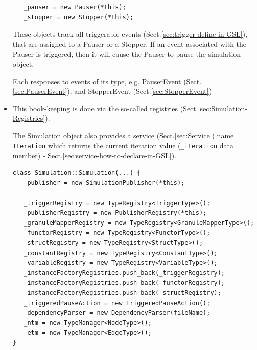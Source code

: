 \begin{itemize}
\begin{lstlisting}
   _pauser = new Pauser(*this);                                                                               
   _stopper = new Stopper(*this);                                                                             
\end{lstlisting}

These objects track all triggerable events
(Sect.\ref{sec:trigger-define-in-GSL}), that are assigned to a Pauser or a
Stopper. If an event associated with the Pauser is triggered, then it will cause
the Pauser to pause the simulation object.

Each responses to events of its type, e.g. PauserEvent (Sect.\ref{sec:PauserEvent}), and
StopperEvent (Sect.\ref{sec:StopperEvent})

  \item  This book-keeping is done via the so-called registries
(Sect.\ref{sec:Simulation-Registries}). 

The Simulation object also provides a service (Sect.\ref{sec:Service}) name
\verb!Iteration! which returns the current iteration value (\verb!_iteration!
data member) - Sect.\ref{sec:service-how-to-declare-in-GSL}).

\begin{verbatim}
class Simulation::Simulation(...) {
   _publisher = new SimulationPublisher(*this);                                                               
 
   _triggerRegistry = new TypeRegistry<TriggerType>();                                                        
   _publisherRegistry = new PublisherRegistry(*this);                                                         
   _granuleMapperRegistry = new TypeRegistry<GranuleMapperType>();                                                      
   _functorRegistry = new TypeRegistry<FunctorType>();                                                        
   _structRegistry = new TypeRegistry<StructType>();                                                          
   _constantRegistry = new TypeRegistry<ConstantType>();                                                      
   _variableRegistry = new TypeRegistry<VariableType>();                                                      
   _instanceFactoryRegistries.push_back(_triggerRegistry);                                                    
   _instanceFactoryRegistries.push_back(_functorRegistry);                                                    
   _instanceFactoryRegistries.push_back(_structRegistry);                                                     
   _triggeredPauseAction = new TriggeredPauseAction();                                                        
   _dependencyParser = new DependencyParser(fileName);                                                        
   _ntm = new TypeManager<NodeType>();                                                                        
   _etm = new TypeManager<EdgeType>();                                           
}
\end{verbatim}



\end{itemize}
